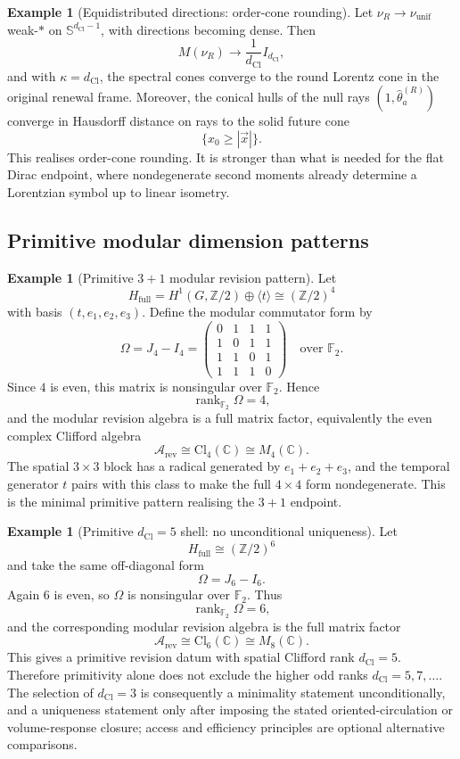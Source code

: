 \documentclass[11pt]{article}
\theoremstyle{definition}
\newtheorem{example}[theorem]{Example}
\theoremstyle{remark}
\newcommand{\Z}{\mathbb{Z}}
\newcommand{\C}{\mathbb{C}}
\newcommand{\F}{\mathbb{F}}
\newcommand{\Arev}{\mathcal{A}_{\mathrm{rev}}}
\newcommand{\Hf}{H_{\mathrm{full}}}
\newcommand{\Cl}{\mathrm{Cl}}
\newcommand{\dCl}{d_{\mathrm{Cl}}}
\newcommand{\rank}{\operatorname{rank}}
\newcommand{\Sphere}{\mathbb{S}}
\begin{document}
\begin{example}[Equidistributed directions: order-cone rounding]
\label{ex:equidistributed}
Let \(\nu_R\to\nu_{\mathrm{unif}}\) weak-\(*\) on
\(\Sphere^{\dCl-1}\), with directions becoming dense.  Then
\[
  M(\nu_R)\longrightarrow \frac1{\dCl}I_{\dCl},
\]
and with \(\kappa=\dCl\), the spectral cones converge to the round Lorentz cone
in the original renewal frame.  Moreover, the conical hulls of the null rays
\((1,\hat\theta_a^{(R)})\) converge in Hausdorff distance on rays to the solid
future cone
\[
  \{x_0\ge|\vec x|\}.
\]
This realises order-cone rounding.  It is stronger than what is needed for the
flat Dirac endpoint, where nondegenerate second moments already determine a
Lorentzian symbol up to linear isometry.
\end{example}

\subsection{Primitive modular dimension patterns}
\label{subsec:examples-primitive}

\begin{example}[Primitive \(3+1\) modular revision pattern]
\label{ex:primitive-d3}
Let
\[
  \Hf=H^1(G,\Z/2)\oplus\langle t\rangle\cong(\Z/2)^4
\]
with basis \((t,e_1,e_2,e_3)\).  Define the modular commutator form by
\[
  \Omega=J_4-I_4
  =
  \begin{pmatrix}
  0&1&1&1\\
  1&0&1&1\\
  1&1&0&1\\
  1&1&1&0
  \end{pmatrix}
  \quad\text{over }\F_2 .
\]
Since \(4\) is even, this matrix is nonsingular over \(\F_2\).  Hence
\[
  \rank_{\F_2}\Omega=4,
\]
and the modular revision algebra is a full matrix factor,
equivalently the even complex Clifford algebra
\[
  \Arev\cong \Cl_4(\C)\cong M_4(\C).
\]
The spatial \(3\times3\) block has a radical generated by
\(e_1+e_2+e_3\), and the temporal generator \(t\) pairs with this class to make
the full \(4\times4\) form nondegenerate.  This is the minimal primitive pattern
realising the \(3+1\) endpoint.
\end{example}

\begin{example}[Primitive \(\dCl=5\) shell: no unconditional uniqueness]
\label{ex:primitive-d5}
Let
\[
  \Hf\cong(\Z/2)^6
\]
and take the same off-diagonal form
\[
  \Omega=J_6-I_6 .
\]
Again \(6\) is even, so \(\Omega\) is nonsingular over \(\F_2\).  Thus
\[
  \rank_{\F_2}\Omega=6,
\]
and the corresponding modular revision algebra is the full matrix factor
\[
  \Arev\cong \Cl_6(\C)\cong M_8(\C).
\]
This gives a primitive revision datum with spatial Clifford rank \(\dCl=5\).
Therefore primitivity alone does not exclude the higher odd ranks
\(\dCl=5,7,\ldots\).  The selection of \(\dCl=3\) is consequently a minimality
statement unconditionally, and a uniqueness statement only after imposing the
stated oriented-circulation or volume-response closure; access and efficiency
principles are optional alternative comparisons.
\end{example}
\end{document}

